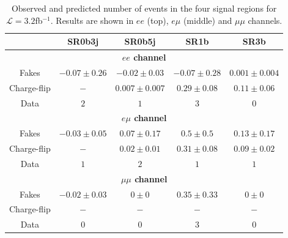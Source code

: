 \documentclass[UKenglish,texlive=2013]{\ATLASLATEXPATH atlasdoc}
\begin{document}
\begin{table}[t!]
\centering
\begin{tabular}{c|cccc}
 & SR0b3j & SR0b5j & SR1b & SR3b\\\hline
\hline\multicolumn{5}{c}{\bf $ee$ channel}\\\hline
Fakes       & $-0.07 \pm 0.26$ & $-0.02 \pm 0.03$ & $-0.07 \pm 0.28$ & $0.001 \pm 0.004$\\
Charge-flip & $-$ & $0.007 \pm 0.007$ & $0.29 \pm 0.08$ & $0.11 \pm 0.06$\\
           Data & $2$ & $1$ & $3$ & $0$ \\
\hline\multicolumn{5}{c}{\bf $e\mu$ channel}\\\hline
Fakes       & $-0.03 \pm 0.05$ & $0.07 \pm 0.17$ & $0.5 \pm 0.5$ & $0.13 \pm 0.17$\\
Charge-flip & $-$ & $0.02 \pm 0.01$ & $0.31 \pm 0.08$ & $0.09 \pm 0.02$\\
           Data & $1$ & $2$ & $1$ & $1$ \\
\hline\multicolumn{5}{c}{\bf $\mu\mu$ channel}\\\hline
Fakes       & $-0.02 \pm 0.03$ & $0 \pm 0$ & $0.35 \pm 0.33$ & $0 \pm 0$\\
Charge-flip & $-$ & $-$ & $-$ & $-$\\
           Data & $0$ & $0$ & $3$ & $0$ \\
\end{tabular}
\caption{Observed and predicted number of events in the four signal regions for $\mathcal L=3.2 $fb$^{-1}$. 
Results are shown in $ee$ (top), $e\mu$ (middle) and $\mu\mu$ channels.}
\label{tab:sr_yields_perCh}
\end{table} 
\end{document}

